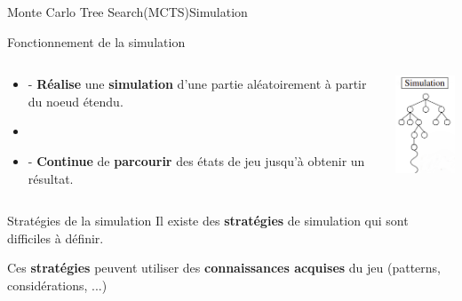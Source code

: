 \begin{frame}{Monte Carlo Tree Search(MCTS)}{Simulation}
	\begin{block}{Fonctionnement de la simulation}
		\begin{columns}
			\begin{column}{7cm}
				\begin{itemize}
					\item - \textbf{Réalise} une \textbf{simulation} d'une partie aléatoirement à partir du noeud étendu.
					\item \
					\item - \textbf{Continue} de \textbf{parcourir} des états de jeu jusqu'à obtenir un résultat.

				\end{itemize}
			\end{column}
			\begin{column}{3cm}
				\includegraphics[width=2.2cm]{ressources/MCTS/Simulation.png}
			\end{column}
		\end{columns}
	\end{block}
	\begin{block}{Stratégies de la simulation}
		Il existe des \textbf{stratégies} de simulation qui sont difficiles à définir.

		Ces \textbf{stratégies} peuvent utiliser des \textbf{connaissances acquises} du jeu (patterns, considérations, ...)
	\end{block}
\end{frame}

